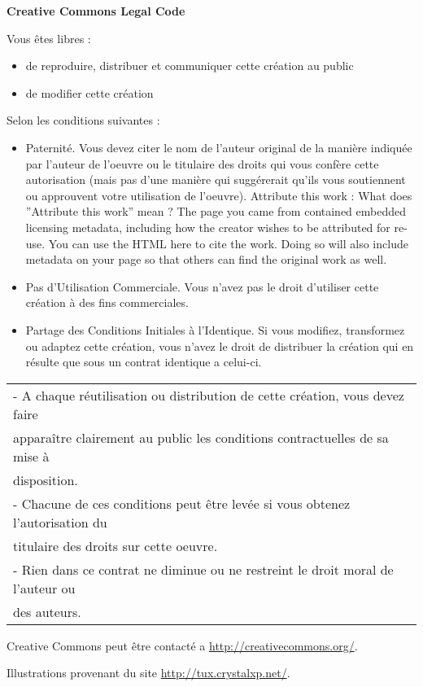 \begin{center} \textbf{Creative Commons Legal Code} \end{center}

\vspace{2cm}

Vous êtes libres :
\begin{itemize}
\item de reproduire, distribuer et communiquer cette création au public
\item de modifier cette création
\end{itemize}
\vspace{1cm}
Selon les conditions suivantes :
\begin{itemize}
\item Paternité. Vous devez citer le nom de l’auteur original de la manière indiquée par l’auteur de l’oeuvre ou le titulaire des
   droits qui vous confère cette autorisation (mais pas d’une manière qui suggérerait qu’ils vous soutiennent ou approuvent
   votre utilisation de l’oeuvre). Attribute this work : What does ”Attribute this work” mean ? The page you came from
   contained embedded licensing metadata, including how the creator wishes to be attributed for re-use. You can use the
   HTML here to cite the work. Doing so will also include metadata on your page so that others can find the original work
   as well.
\item Pas d’Utilisation Commerciale. Vous n’avez pas le droit d’utiliser cette création à des fins commerciales.
\item Partage des Conditions Initiales à l’Identique. Si vous modifiez, transformez ou adaptez cette création, vous n’avez le
droit de distribuer la création qui en résulte que sous un contrat identique a celui-ci.
\end{itemize}

\vspace{1cm}
\begin{tabular}{|l|}
\hline
- A chaque réutilisation ou distribution de cette création, vous devez faire\\
apparaître clairement au public les conditions contractuelles de sa mise à\\
disposition.\\
- Chacune de ces conditions peut être levée si vous obtenez l’autorisation du\\
titulaire des droits sur cette oeuvre.\\
- Rien dans ce contrat ne diminue ou ne restreint le droit moral de l’auteur ou\\
des auteurs.\\
\hline
\end{tabular}
\vspace{1cm}

Creative Commons peut être contacté a \url{http://creativecommons.org/}.

Illustrations provenant du site \url{http://tux.crystalxp.net/}.

